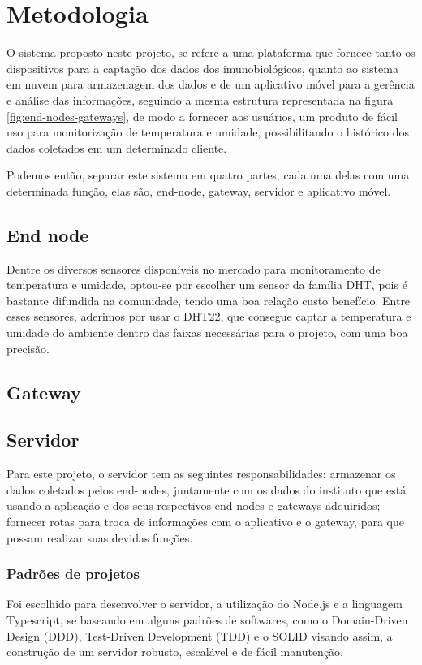 \chapter{Metodologia}
\label{cap:metodologia}
O sistema proposto neste projeto, se refere a uma plataforma que fornece tanto os dispositivos para a captação dos dados dos imunobiológicos, quanto ao sistema em nuvem para armazenagem dos dados e de um aplicativo móvel para a gerência e análise das informações, seguindo a mesma estrutura representada na figura \ref{fig:end-nodes-gateways}, de modo a fornecer aos usuários, um produto  de fácil uso para monitorização de temperatura e umidade, possibilitando o histórico dos dados coletados em um determinado cliente.

Podemos então, separar este sistema em quatro partes, cada uma delas com uma determinada função, elas são, end-node, gateway, servidor e aplicativo móvel.

\section{End node}
\label{metod:node}
Dentre os diversos sensores disponíveis no mercado para monitoramento de temperatura e umidade, optou-se por escolher um sensor da família DHT, pois é bastante difundida na comunidade, tendo uma boa relação custo benefício. Entre esses sensores, aderimos por usar o DHT22, que consegue captar a temperatura e umidade do ambiente dentro das faixas necessárias para o projeto, com uma boa precisão.

\section{Gateway}
\label{metod:gateway}

\section{Servidor}
\label{metod:servidor}
Para este projeto, o servidor tem as seguintes responsabilidades: armazenar os dados coletados pelos end-nodes, juntamente com os dados do instituto que está usando a aplicação e dos seus respectivos end-nodes e gateways adquiridos; fornecer rotas para troca de informações com o aplicativo e o gateway, para que possam realizar suas devidas funções.

\subsection{Padrões de projetos}
\label{metod:servidor:padroes}
Foi escolhido para desenvolver o servidor, a utilização do Node.js e a linguagem Typescript, se baseando em alguns padrões de softwares, como o Domain-Driven Design (DDD), Test-Driven Development (TDD) e o SOLID visando assim, a construção de um servidor robusto, escalável e de fácil manutenção.

